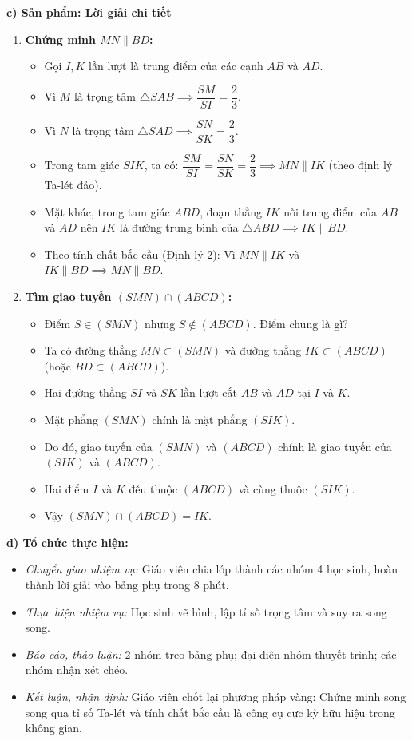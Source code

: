 \documentclass[12pt, a4paper]{article}
\begin{document}
\noindent \textbf{c) Sản phẩm: Lời giải chi tiết}
\begin{enumerate}[leftmargin=0.6cm]
    \item \textbf{Chứng minh $MN \parallel BD$:}
    \begin{itemize}
        \item Gọi $I, K$ lần lượt là trung điểm của các cạnh $AB$ và $AD$.
        \item Vì $M$ là trọng tâm $\triangle SAB \implies \dfrac{SM}{SI} = \dfrac{2}{3}$.
        \item Vì $N$ là trọng tâm $\triangle SAD \implies \dfrac{SN}{SK} = \dfrac{2}{3}$.
        \item Trong tam giác $SIK$, ta có: $\dfrac{SM}{SI} = \dfrac{SN}{SK} = \dfrac{2}{3} \implies MN \parallel IK$ (theo định lý Ta-lét đảo).
        \item Mặt khác, trong tam giác $ABD$, đoạn thẳng $IK$ nối trung điểm của $AB$ và $AD$ nên $IK$ là đường trung bình của $\triangle ABD \implies IK \parallel BD$.
        \item Theo tính chất bắc cầu (Định lý 2): Vì $MN \parallel IK$ và $IK \parallel BD \implies MN \parallel BD$.
    \end{itemize}
    \item \textbf{Tìm giao tuyến $(SMN) \cap (ABCD)$:}
    \begin{itemize}
        \item Điểm $S \in (SMN)$ nhưng $S \notin (ABCD)$. Điểm chung là gì?
        \item Ta có đường thẳng $MN \subset (SMN)$ và đường thẳng $IK \subset (ABCD)$ (hoặc $BD \subset (ABCD)$).
        \item Hai đường thẳng $SI$ và $SK$ lần lượt cắt $AB$ và $AD$ tại $I$ và $K$.
        \item Mặt phẳng $(SMN)$ chính là mặt phẳng $(SIK)$.
        \item Do đó, giao tuyến của $(SMN)$ và $(ABCD)$ chính là giao tuyến của $(SIK)$ và $(ABCD)$.
        \item Hai điểm $I$ và $K$ đều thuộc $(ABCD)$ và cùng thuộc $(SIK)$.
        \item Vậy $(SMN) \cap (ABCD) = IK$.
    \end{itemize}
\end{enumerate}

\noindent \textbf{d) Tổ chức thực hiện:}
\begin{itemize}[leftmargin=0.8cm]
    \item \textit{Chuyển giao nhiệm vụ:} Giáo viên chia lớp thành các nhóm 4 học sinh, hoàn thành lời giải vào bảng phụ trong 8 phút.
    \item \textit{Thực hiện nhiệm vụ:} Học sinh vẽ hình, lập tỉ số trọng tâm và suy ra song song.
    \item \textit{Báo cáo, thảo luận:} 2 nhóm treo bảng phụ; đại diện nhóm thuyết trình; các nhóm nhận xét chéo.
    \item \textit{Kết luận, nhận định:} Giáo viên chốt lại phương pháp vàng: Chứng minh song song qua tỉ số Ta-lét và tính chất bắc cầu là công cụ cực kỳ hữu hiệu trong không gian.
\end{itemize}
\end{document}
